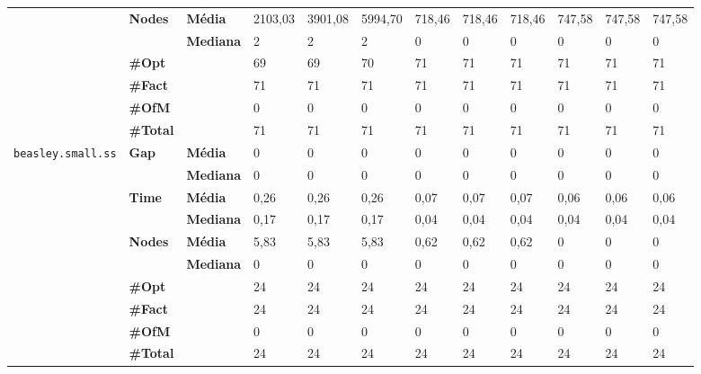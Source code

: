 \documentclass[]{article}
\begin{document}
\begin{table}[]
\begin{adjustbox}{angle=90}
\begin{tabular}{cll|lll|lll|lll}
				\cline{2-12}
				& \multirow{2}{*}{\textbf{Nodes}} & \textbf{Média} & 2103,03 & 3901,08 & 5994,70 & 718,46 & 718,46 & 718,46 & 747,58 & 747,58 & 747,58 \\
				& & \textbf{Mediana} & 2 & 2 & 2 & 0 & 0 & 0 & 0 & 0 & 0 \\
				\cline{2-12}
				& \textbf{\#Opt} & & 69 & 69 & 70 & 71 & 71 & 71 & 71 & 71 & 71 \\
				& \textbf{\#Fact} & & 71 & 71 & 71 & 71 & 71 & 71 & 71 & 71 & 71 \\
				& \textbf{\#OfM} & & 0 & 0 & 0 & 0 & 0 & 0 & 0 & 0 & 0 \\
				& \textbf{\#Total} & & 71 & 71 & 71 & 71 & 71 & 71 & 71 & 71 & 71 \\
				\hline
				\multirow{7}{*}{\texttt{beasley.small.ss}} & \multirow{2}{*}{\textbf{Gap}} & \textbf{Média} & 0 & 0 & 0 & 0 & 0 & 0 & 0 & 0 & 0 \\
				& & \textbf{Mediana} & 0 & 0 & 0 & 0 & 0 & 0 & 0 & 0 & 0 \\
				\cline{2-12}
				& \multirow{2}{*}{\textbf{Time}} & \textbf{Média} & 0,26 & 0,26 & 0,26 & 0,07 & 0,07 & 0,07 & 0,06 & 0,06 & 0,06 \\
				& & \textbf{Mediana} & 0,17 & 0,17 & 0,17 & 0,04 & 0,04 & 0,04 & 0,04 & 0,04 & 0,04 \\
				\cline{2-12}
				& \multirow{2}{*}{\textbf{Nodes}} & \textbf{Média} & 5,83 & 5,83 & 5,83 & 0,62 & 0,62 & 0,62 & 0 & 0 & 0 \\
				& & \textbf{Mediana} & 0 & 0 & 0 & 0 & 0 & 0 & 0 & 0 & 0 \\
				\cline{2-12}
				& \textbf{\#Opt} & & 24 & 24 & 24 & 24 & 24 & 24 & 24 & 24 & 24 \\
				& \textbf{\#Fact} & & 24 & 24 & 24 & 24 & 24 & 24 & 24 & 24 & 24 \\
				& \textbf{\#OfM} & & 0 & 0 & 0 & 0 & 0 & 0 & 0 & 0 & 0 \\
				& \textbf{\#Total} & & 24 & 24 & 24 & 24 & 24 & 24 & 24 & 24 & 24 \\
			\end{tabular}
		\end{adjustbox}
	\end{table}
	
\end{document}
